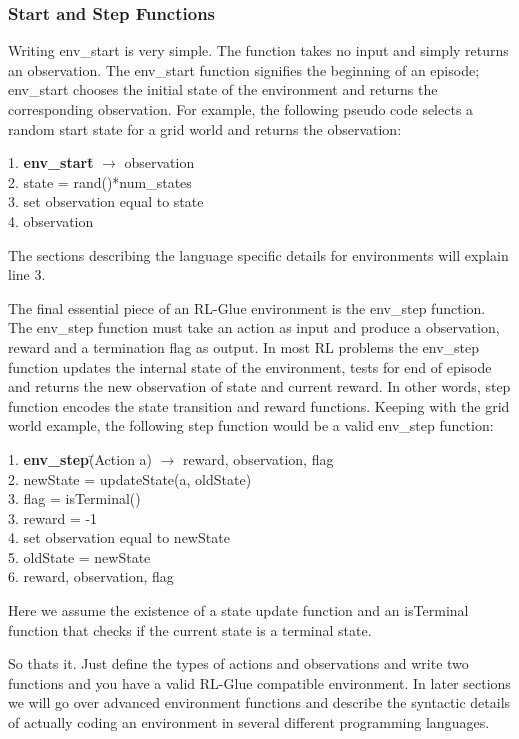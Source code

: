 \documentclass[11pt]{article}
\begin{document}
\subsubsection{Start and Step Functions}
Writing env\_start is very simple. The function takes no input and simply returns an observation. The env\_start function signifies the beginning of an episode; env\_start chooses the initial state of the environment and returns the corresponding observation. For example, the following pseudo code selects a random start state for a grid world and returns the observation:
\begin{tabbing}
1. {\bf env\_start}\= $\rightarrow$ observation\\
2. \>state = rand()*num\_states\\
3. \>set observation equal to state\\
4.  observation
\end{tabbing}
The sections describing the language specific details for environments will explain line 3.

The final essential piece of an RL-Glue environment is the env\_step function. The env\_step function must take an action as input and produce a observation, reward and a termination flag as output. In most RL problems the  env\_step function updates the internal state of the environment, tests for end of episode and returns the new observation of state and current reward. In other words, step function encodes the state transition and reward functions. Keeping with the grid world example, the following step function would be a valid env\_step function:
\begin{tabbing}
1. {\bf env\_step}\=(Action a) $\rightarrow$ reward, observation, flag \\
2. \>newState = updateState(a, oldState)\\
3. \> flag = isTerminal()\\
3. \> reward = -1\\
4. \>set observation equal to newState\\
5. \>oldState = newState\\
6.  reward, observation, flag
\end{tabbing}
Here we assume the existence of a state update function and an isTerminal function that checks if the current state is a terminal state.

So thats it. Just define the types of actions and observations and write two functions and you have a valid RL-Glue compatible environment. In later sections we will go over advanced environment functions and describe the syntactic details of actually coding an environment in several different programming languages. 
\end{document}
